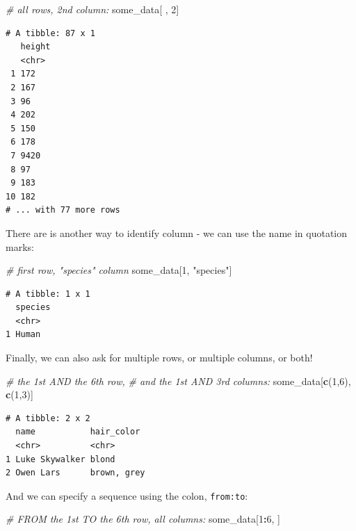 \documentclass[]{book}
\newenvironment{Shaded}{\begin{snugshade}}{\end{snugshade}}
\newcommand{\CommentTok}[1]{\textcolor[rgb]{0.56,0.35,0.01}{\textit{#1}}}
\newcommand{\DecValTok}[1]{\textcolor[rgb]{0.00,0.00,0.81}{#1}}
\newcommand{\KeywordTok}[1]{\textcolor[rgb]{0.13,0.29,0.53}{\textbf{#1}}}
\newcommand{\NormalTok}[1]{#1}
\newcommand{\OperatorTok}[1]{\textcolor[rgb]{0.81,0.36,0.00}{\textbf{#1}}}
\newcommand{\StringTok}[1]{\textcolor[rgb]{0.31,0.60,0.02}{#1}}
\begin{document}
\begin{Shaded}
\begin{Highlighting}[]
\CommentTok{# all rows, 2nd column:}
\NormalTok{some_data[ , }\DecValTok{2}\NormalTok{]}
\end{Highlighting}
\end{Shaded}

\begin{verbatim}
# A tibble: 87 x 1
   height
   <chr> 
 1 172   
 2 167   
 3 96    
 4 202   
 5 150   
 6 178   
 7 9420  
 8 97    
 9 183   
10 182   
# ... with 77 more rows
\end{verbatim}

There are is another way to identify column - we can use the name in quotation marks:

\begin{Shaded}
\begin{Highlighting}[]
\CommentTok{# first row, "species" column}
\NormalTok{some_data[}\DecValTok{1}\NormalTok{, }\StringTok{"species"}\NormalTok{]}
\end{Highlighting}
\end{Shaded}

\begin{verbatim}
# A tibble: 1 x 1
  species
  <chr>  
1 Human  
\end{verbatim}

Finally, we can also ask for multiple rows, or multiple columns, or both!

\begin{Shaded}
\begin{Highlighting}[]
\CommentTok{# the 1st AND the 6th row, }
\CommentTok{# and the 1st AND 3rd columns:}
\NormalTok{some_data[}\KeywordTok{c}\NormalTok{(}\DecValTok{1}\NormalTok{,}\DecValTok{6}\NormalTok{), }\KeywordTok{c}\NormalTok{(}\DecValTok{1}\NormalTok{,}\DecValTok{3}\NormalTok{)]}
\end{Highlighting}
\end{Shaded}

\begin{verbatim}
# A tibble: 2 x 2
  name           hair_color 
  <chr>          <chr>      
1 Luke Skywalker blond      
2 Owen Lars      brown, grey
\end{verbatim}

And we can specify a sequence using the colon, \texttt{from:to}:

\begin{Shaded}
\begin{Highlighting}[]
\CommentTok{# FROM the 1st TO the 6th row, all columns:}
\NormalTok{some_data[}\DecValTok{1}\OperatorTok{:}\DecValTok{6}\NormalTok{, ]}
\end{Highlighting}
\end{Shaded}
\end{document}
